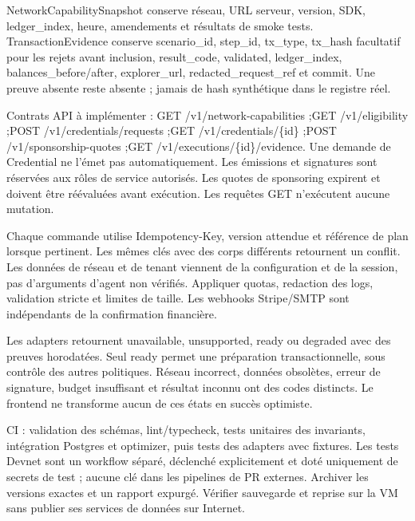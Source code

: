 \documentclass[10pt,a4paper]{article}
\begin{document}
NetworkCapabilitySnapshot conserve réseau, URL serveur, version, SDK, ledger\_\allowbreak index, heure, amendements et résultats de smoke tests. TransactionEvidence conserve scenario\_\allowbreak id, step\_\allowbreak id, tx\_\allowbreak type, tx\_\allowbreak hash facultatif pour les rejets avant inclusion, result\_\allowbreak code, validated, ledger\_\allowbreak index, balances\_\allowbreak before/after, explorer\_\allowbreak url, redacted\_\allowbreak request\_\allowbreak ref et commit. Une preuve absente reste absente ; jamais de hash synthétique dans le registre réel.\par

Contrats API à implémenter : GET /v1/\allowbreak network-capabilities ;\newline GET /v1/\allowbreak eligibility ;\newline POST /v1/\allowbreak credentials/requests ;\newline GET /v1/\allowbreak credentials/\{id\} ;\newline POST /v1/\allowbreak sponsorship-quotes ;\newline GET /v1/\allowbreak executions/\{id\}/evidence. Une demande de Credential ne l'émet pas automatiquement. Les émissions et signatures sont réservées aux rôles de service autorisés. Les quotes de sponsoring expirent et doivent être réévaluées avant exécution. Les requêtes GET n'exécutent aucune mutation.\par

Chaque commande utilise Idempotency-Key, version attendue et référence de plan lorsque pertinent. Les mêmes clés avec des corps différents retournent un conflit. Les données de réseau et de tenant viennent de la configuration et de la session, pas d'arguments d'agent non vérifiés. Appliquer quotas, redaction des logs, validation stricte et limites de taille. Les webhooks Stripe/SMTP sont indépendants de la confirmation financière.\par

Les adapters retournent unavailable, unsupported, ready ou degraded avec des preuves horodatées. Seul ready permet une préparation transactionnelle, sous contrôle des autres politiques. Réseau incorrect, données obsolètes, erreur de signature, budget insuffisant et résultat inconnu ont des codes distincts. Le frontend ne transforme aucun de ces états en succès optimiste.\par

CI : validation des schémas, lint/typecheck, tests unitaires des invariants, intégration Postgres et optimizer, puis tests des adapters avec fixtures. Les tests Devnet sont un workflow séparé, déclenché explicitement et doté uniquement de secrets de test ; aucune clé dans les pipelines de PR externes. Archiver les versions exactes et un rapport expurgé. Vérifier sauvegarde et reprise sur la VM sans publier ses services de données sur Internet.\par
\end{document}
